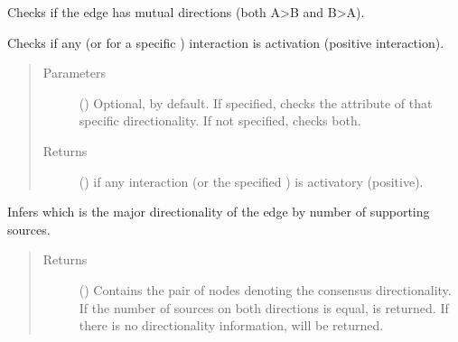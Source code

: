 \documentclass[letterpaper,10pt,english]{sphinxmanual}
\begin{document}
\begin{fulllineitems}

\begin{fulllineitems}
\label{\detokenize{reference:pypath.main.Direction.is_mutual}}
Checks if the edge has mutual directions (both A\textendash{}\textgreater{}B and B\textendash{}\textgreater{}A).

\end{fulllineitems}


\begin{fulllineitems}
\label{\detokenize{reference:pypath.main.Direction.is_stimulation}}
Checks if any (or for a specific ) interaction is
activation (positive interaction).
\begin{quote}\begin{description}
\item[{Parameters}] \leavevmode
{} () \textendash{} Optional,  by default. If specified, checks the
 attribute of that specific
directionality. If not specified, checks both.

\item[{Returns}] \leavevmode
() \textendash{}  if any interaction (or the specified
) is activatory (positive).

\end{description}\end{quote}

\end{fulllineitems}


\begin{fulllineitems}
\label{\detokenize{reference:pypath.main.Direction.majority_dir}}
Infers which is the major directionality of the edge by number
of supporting sources.
\begin{quote}\begin{description}
\item[{Returns}] \leavevmode
() \textendash{} Contains the pair of nodes denoting the
consensus directionality. If the number of sources on both
directions is equal,  is returned. If there is no
directionality information,  will be
returned.


\end{description}
\end{quote}
\end{fulllineitems}
\end{fulllineitems}
\end{document}
